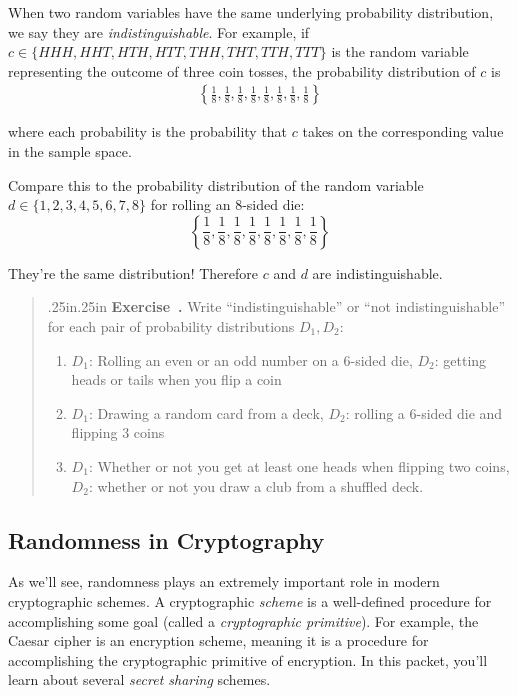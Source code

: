 \documentclass[12 pt]{article}
\newcounter{exercise}[section]
\newenvironment{exercise}{\refstepcounter{exercise}\par\bigskip \begin{quotation}{}{\leftmargin .25in\rightmargin .25in}
    \noindent \textbf{Exercise~\thesection.\theexercise }  \rmfamily}{\end{quotation}\par\bigskip}
\newcounter{example}[section]
\begin{document}
When two random variables have the same underlying probability 
distribution, we say they are \emph{indistinguishable}. For example,
if $c \in \{HHH, HHT,\allowbreak HTH, HTT, THH, THT, TTH, TTT\}$ 
is the random variable representing the outcome of three coin tosses,
the probability distribution of $c$ is 
\begin{align*}
    \left\{
        \frac{1}{8},\frac{1}{8},\frac{1}{8},\frac{1}{8},
        \frac{1}{8},\frac{1}{8},\frac{1}{8},\frac{1}{8}
    \right\}
\end{align*}

where each probability is the probability that $c$ takes on the 
corresponding value in the sample space.

Compare this to the probability distribution of the random 
variable $d \in \{1,2,3,4,5,6,7,8\}$ for rolling an 8-sided die:
\[
    \left\{
        \frac{1}{8},\frac{1}{8},\frac{1}{8},\frac{1}{8},
        \frac{1}{8},\frac{1}{8},\frac{1}{8},\frac{1}{8}
    \right\}
\]

They're the same distribution! Therefore $c$ and $d$ are 
indistinguishable.

\begin{exercise}
    Write ``indistinguishable'' or ``not indistinguishable''
    for each pair of probability distributions $D_1, D_2$:
    \renewcommand{\labelenumi}{(\alph{enumi})} 
    \begin{enumerate}
        \item $D_1$: Rolling an even or an odd number on a 6-sided die, 
        $D_2$: getting heads or tails when you flip a coin
        \item $D_1$: Drawing a random card from a deck, $D_2$: rolling a 6-sided 
        die and flipping 3 coins
        \item $D_1$: Whether or not you get at least one heads when flipping
        two coins, $D_2$: whether or not you draw a club from a shuffled 
        deck.
    \end{enumerate}
\end{exercise}

\subsection{Randomness in Cryptography}

As we'll see, randomness plays an extremely important role in modern cryptographic
schemes. A cryptographic \emph{scheme} is a well-defined procedure for accomplishing 
some goal (called a \emph{cryptographic primitive}). For example, the Caesar 
cipher is an encryption scheme, meaning it is a procedure for accomplishing
the cryptographic primitive of encryption. 
In this packet, you'll learn about several \emph{secret sharing} schemes.
\end{document}
